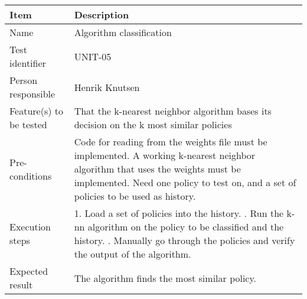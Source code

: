 \documentclass[12pt, fullpage, oneside]{report}
\begin{document}
		\begin{center}
			\begin{tabular}{ |  p{3.5cm} | p{10cm} | }
				\hline
				Item & Description \\ [5pt] \hline \hline
				Name & Algorithm classification \\  [5pt] \hline
				Test identifier & UNIT-05 \\  [5pt] \hline
				Person responsible & Henrik Knutsen \\  [5pt] \hline
				Feature(s) to be tested & That the k-nearest neighbor algorithm bases its decision on the k most similar policies \\  [5pt] \hline
				Pre-conditions & Code for reading from the weights file must be implemented. A working k-nearest neighbor algorithm that uses the weights must be implemented. Need one policy to test on, and a set of policies to be used as history. \\  [5pt] \hline
				Execution steps & 1. Load a set of policies into the history. \newline 2. Run the k-nn algorithm on the policy to be classified and the history. \newline 3. Manually go through the policies and verify the output of the algorithm. \\  [5pt] \hline
				Expected result & The algorithm finds the most similar policy. \\  [5pt] \hline
			\end{tabular}
		\end{center}
\end{document}
